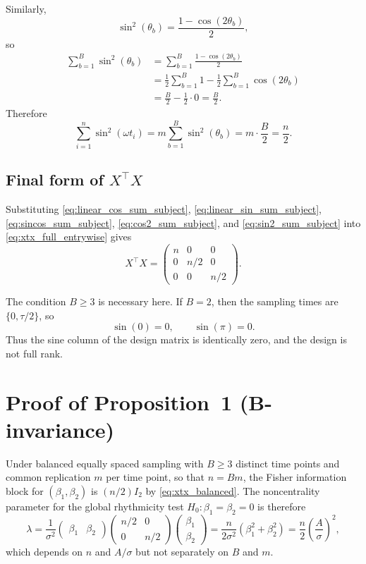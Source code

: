 \documentclass[11pt]{article}
\begin{document}
Similarly,
\[
\sin^2(\theta_b)=\frac{1-\cos(2\theta_b)}{2},
\]
so
\begin{align*}
\sum_{b=1}^B \sin^2(\theta_b)
&=
\sum_{b=1}^B \frac{1-\cos(2\theta_b)}{2}\\
&=
\frac{1}{2}\sum_{b=1}^B 1
-
\frac{1}{2}\sum_{b=1}^B \cos(2\theta_b)\\
&=
\frac{B}{2}
-
\frac{1}{2}\cdot 0
=
\frac{B}{2}.
\end{align*}
Therefore
\begin{equation}
\sum_{i=1}^n \sin^2(\omega t_i)
=
m\sum_{b=1}^B \sin^2(\theta_b)
=
m\cdot \frac{B}{2}
=
\frac{n}{2}.
\label{eq:sin2_sum_subject}
\end{equation}

\subsection*{Final form of \texorpdfstring{$X^\top X$}{X'X}}

Substituting \eqref{eq:linear_cos_sum_subject}, \eqref{eq:linear_sin_sum_subject},
\eqref{eq:sincos_sum_subject}, \eqref{eq:cos2_sum_subject}, and \eqref{eq:sin2_sum_subject}
into \eqref{eq:xtx_full_entrywise} gives
\[
X^\top X=
\begin{pmatrix}
n & 0 & 0\\
0 & n/2 & 0\\
0 & 0 & n/2
\end{pmatrix}.
\]

The condition $B\ge 3$ is necessary here. If $B=2$, then the sampling times are
$\{0,\tau/2\}$, so
\[
\sin(0)=0,
\qquad
\sin(\pi)=0.
\]
Thus the sine column of the design matrix is identically zero, and the design is not full rank.

\section{Proof of Proposition~1 (B-invariance)}
\label{sec:proof_b_invariance}

Under balanced equally spaced sampling with $B\ge 3$ distinct time points and
common replication $m$ per time point, so that $n=Bm$, the Fisher information
block for $(\beta_1,\beta_2)$ is $(n/2)I_2$ by \eqref{eq:xtx_balanced}.
The noncentrality parameter for the global rhythmicity test
$H_0:\beta_1=\beta_2=0$ is therefore
\[
\lambda
=
\frac{1}{\sigma^2}
\begin{pmatrix}\beta_1 & \beta_2\end{pmatrix}
\begin{pmatrix} n/2 & 0 \\ 0 & n/2 \end{pmatrix}
\begin{pmatrix}\beta_1 \\ \beta_2\end{pmatrix}
=
\frac{n}{2\sigma^2}(\beta_1^2+\beta_2^2)
=
\frac{n}{2}\left(\frac{A}{\sigma}\right)^2,
\]
which depends on $n$ and $A/\sigma$ but not separately on $B$ and $m$.
\end{document}
